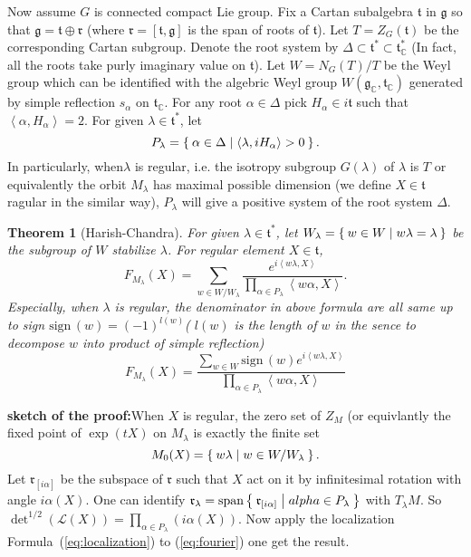 \documentclass[11pt]{amsart}
\newtheorem{Thm}{Theorem}
\def\cL{{\mathcal{L}}}
\def\bC{{\mathbb{C}}}
\def\fgg{{\mathfrak{g}}}
\def\ftt{{\mathfrak{t}}}
\def\frr{{\mathfrak{r}}}
\def\sproof{{\bf sketch of the proof:}}
\def\inn#1#2{\left<{#1},{#2}\right>}
\def\sign{\mathrm{sign\,}}
\def\sspan{\mathrm{span}}
\begin{document}
Now assume $G$ is connected compact Lie group.
Fix a Cartan subalgebra $\ftt$ in $\fgg$ so that $\fgg=\ftt\oplus \frr$ (where $\frr = [\ftt,\fgg]$ is the span of roots of $\ftt$). Let $T = Z_G(\ftt)$ be the corresponding Cartan subgroup. Denote the root system by $\Delta \subset \ftt^* \subset \ftt_\bC^*$ (In fact, all the roots take purly imaginary value on $\ftt$).
Let $W = N_G(T)/T$ be the Weyl group which can be identified with the algebric Weyl group $W(\fgg_\bC,\ftt_\bC)$ generated by simple reflection $s_\alpha$ on $\ftt_\bC$. 
For any root $\alpha\in \Delta$ pick $H_\alpha \in i\ftt$ such that $\inn{\alpha}{H_\alpha}=2$.
For given $\lambda\in\ftt^*$,
let 
\begin{equation}\label{eq:positive}
P_\lambda = \Set{\alpha\in \Delta|\inn{\lambda}{iH_\alpha}>0}.
\end{equation}
In particularly, when$\lambda$ is regular, i.e. 
the isotropy subgroup $G(\lambda)$ of $\lambda$ is $T$ 
or equivalently the orbit $M_\lambda$ has maximal possible dimension (we define $X\in \ftt$ ragular in the similar way), $P_\lambda$ will give a positive system of the root system $\Delta$.

\begin{Thm}[Harish-Chandra]
For given $\lambda\in \ftt^*$, let $W_\lambda = \Set{w\in W|w\lambda = \lambda}$
be the subgroup of $W$ stabilize $\lambda$. For regular element $X\in \ftt$, 
\begin{equation}\label{eq:fourier}
F_{M_\lambda}(X) = \sum_{w\in W/W_\lambda}\frac{e^{i\inn{w\lambda}{X}}}{
\prod_{\alpha\in P_\lambda}\inn{w\alpha}{X}}. 
\end{equation}
Especially, when $\lambda$ is regular, the denominator in above formula are 
all same up to sign $\sign(w) = (-1)^{l(w)}$( $l(w)$ is the length of $w$ in the sence to decompose $w$ into product of simple reflection)
\begin{equation}
\label{eq:harish1}
F_{M_\lambda}(X) = \frac{\sum_{w\in W} \sign(w)e^{i\inn{w\lambda}{X}}}{\prod_{\alpha\in P_\lambda}\inn{w\alpha}{X}}
\end{equation}
\end{Thm}
\sproof When $X$ is regular, the zero set of $Z_M$
(or equivlantly the fixed point of $\exp(tX)$ on $M_\lambda$ is exactly
the finite set 
\[
M_0(X) = \Set{w\lambda|w\in W/W_\lambda}.
\]
Let $\frr_{[i\alpha]}$ be the subspace of $\frr$ 
such that $X$ act on it by infinitesimal rotation with angle $i\alpha(X)$.
One can identify $\frr_\lambda = \sspan\Set{\frr_{[i\alpha]}|alpha \in P_\lambda}$ 
with $T_\lambda M$. So $\det^{1/2}(\cL(X)) = \prod_{\alpha\in P_\lambda}(i\alpha(X))$.
Now apply the localization Formula~(\ref{eq:localization}) 
to (\ref{eq:fourier}) one get the result.
\end{document}
